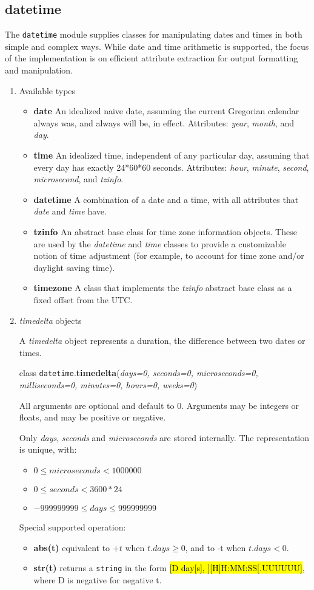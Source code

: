 \subsection{datetime}
The \texttt{datetime} module supplies classes for manipulating dates and times in both simple and complex ways. While date and time arithmetic is supported, the focus of the implementation is on efficient attribute extraction for output formatting and manipulation.
\begin{enumerate}
\item Available types
\begin{itemize}
\item \textbf{date} An idealized naive date, assuming the current Gregorian calendar always was, and always will be, in effect. Attributes: \textit{year}, \textit{month}, and \textit{day}.
\item \textbf{time} An idealized time, independent of any particular day, assuming that every day has exactly 24*60*60 seconds. Attributes: \textit{hour}, \textit{minute}, \textit{second}, \textit{microsecond}, and \textit{tzinfo}.
\item \textbf{datetime} A combination of a date and a time, with all attributes that \textit{date} and \textit{time} have.
\item \textbf{tzinfo} An abstract base class for time zone information objects. These are used by the \textit{datetime} and \textit{time} classes to provide a customizable notion of time adjustment (for example, to account for time zone and/or daylight saving time).
\item \textbf{timezone} A class that implements the \textit{tzinfo} abstract base class as a fixed offset from the UTC.
\end{itemize}

\item \textit{timedelta} objects

A \textit{timedelta} object represents a duration, the difference between two dates or times.

class \texttt{datetime}.\textbf{timedelta}(\textit{days=0, seconds=0, microseconds=0, milliseconds=0, minutes=0, hours=0, weeks=0}) 

All arguments are optional and default to 0. Arguments may be integers or floats, and may be positive or negative. 

Only \textit{days}, \textit{seconds} and \textit{microseconds} are stored internally. The representation is unique, with:
\begin{itemize}
\item $0 \leq microseconds < 1000000$
\item $0 \le seconds < 3600*24$
\item $-999999999 \le days \le 999999999$
\end{itemize}
Special supported operation:
\begin{itemize}
\item \textbf{abs(t)} equivalent to $+t$ when $t.days \ge 0$, and to -t when $t.days < 0$.
\item \textbf{str(t)} returns a \texttt{string} in the form \hl{[D day[s], ][H]H:MM:SS[.UUUUUU]}, where D is negative for negative t. 
\end{itemize}


\end{enumerate}
